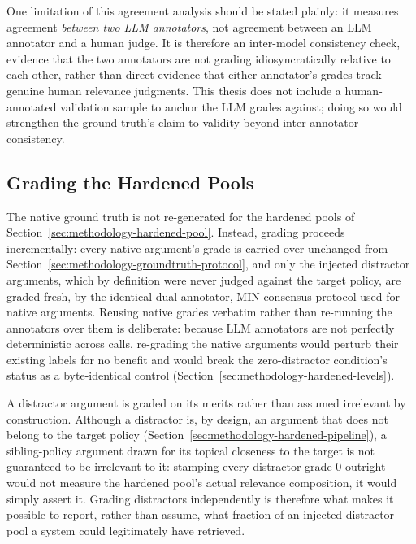One limitation of this agreement analysis should be stated plainly: it measures agreement
\emph{between two LLM annotators}, not agreement between an LLM annotator and a human judge. It is
therefore an inter-model consistency check, evidence that the two annotators are not grading
idiosyncratically relative to each other, rather than direct evidence that either annotator's
grades track genuine human relevance judgments. This thesis does not include a human-annotated
validation sample to anchor the LLM grades against; doing so would strengthen the ground truth's
claim to validity beyond inter-annotator consistency.

\subsection{Grading the Hardened Pools}
\label{sec:methodology-groundtruth-distractors}

The native ground truth is not re-generated for the hardened pools of
Section~\ref{sec:methodology-hardened-pool}. Instead, grading proceeds incrementally: every native
argument's grade is carried over unchanged from Section~\ref{sec:methodology-groundtruth-protocol},
and only the injected distractor arguments, which by definition were never judged against the
target policy, are graded fresh, by the identical dual-annotator, MIN-consensus protocol used for
native arguments. Reusing native grades verbatim rather than re-running the annotators over them
is deliberate: because LLM annotators are not perfectly deterministic across calls, re-grading the
native arguments would perturb their existing labels for no benefit and would break the
zero-distractor condition's status as a byte-identical control
(Section~\ref{sec:methodology-hardened-levels}).

A distractor argument is graded on its merits rather than assumed irrelevant by construction.
Although a distractor is, by design, an argument that does not belong to the target policy
(Section~\ref{sec:methodology-hardened-pipeline}), a sibling-policy argument drawn for its
topical closeness to the target is not guaranteed to be irrelevant to it: stamping every
distractor grade 0 outright would not measure the hardened pool's actual relevance composition, it
would simply assert it. Grading distractors independently is therefore what makes it possible to
report, rather than assume, what fraction of an injected distractor pool a system could
legitimately have retrieved.

